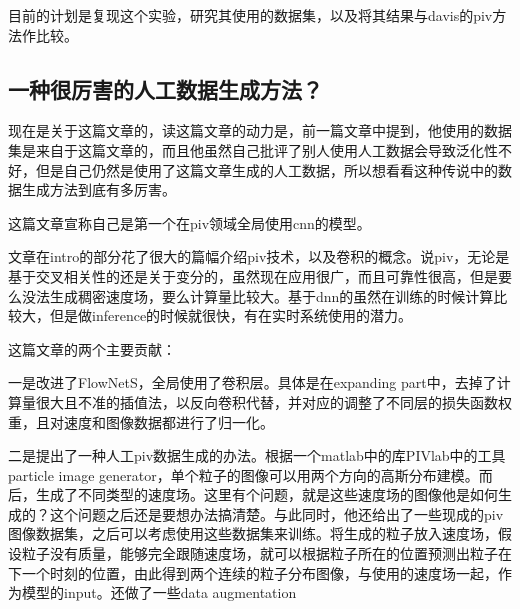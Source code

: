 \documentclass[UTF8]{ctexart}
\begin{document}
目前的计划是复现这个实验，研究其使用的数据集，以及将其结果与davis的piv方法作比较。


\subsection{一种很厉害的人工数据生成方法？}

现在是关于这篇文章\cite{cai_dense_2019}的，读这篇文章的动力是，前一篇文章中提到，他使用的数据集是来自于这篇文章的，而且他虽然自己批评了别人使用人工数据会导致泛化性不好，但是自己仍然是使用了这篇文章生成的人工数据，所以想看看这种传说中的数据生成方法到底有多厉害。

这篇文章宣称自己是第一个在piv领域全局使用cnn的模型。

文章在intro的部分花了很大的篇幅介绍piv技术，以及卷积的概念。说piv，无论是基于交叉相关性的还是关于变分的，虽然现在应用很广，而且可靠性很高，但是要么没法生成稠密速度场，要么计算量比较大。基于dnn的虽然在训练的时候计算比较大，但是做inference的时候就很快，有在实时系统使用的潜力。

这篇文章的两个主要贡献：

一是改进了FlowNetS，全局使用了卷积层。具体是在expanding part中，去掉了计算量很大且不准的插值法，以反向卷积代替，并对应的调整了不同层的损失函数权重，且对速度和图像数据都进行了归一化。

二是提出了一种人工piv数据生成的办法。根据一个matlab中的库PIVlab中的工具particle image generator，单个粒子的图像可以用两个方向的高斯分布建模。而后，生成了不同类型的速度场。这里有个问题，就是这些速度场的图像他是如何生成的？这个问题之后还是要想办法搞清楚。与此同时，他还给出了一些现成的piv图像数据集，之后可以考虑使用这些数据集来训练。将生成的粒子放入速度场，假设粒子没有质量，能够完全跟随速度场，就可以根据粒子所在的位置预测出粒子在下一个时刻的位置，由此得到两个连续的粒子分布图像，与使用的速度场一起，作为模型的input。还做了一些data augmentation




\end{document}
